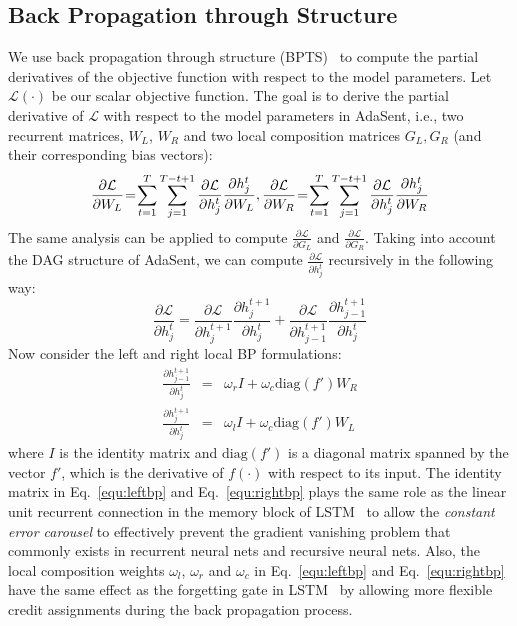 \documentclass{article}
\theoremstyle{definition}
\begin{document}
\subsection{Back Propagation through Structure}
We use back propagation through structure (BPTS)~\cite{goller1996learning} to compute the partial derivatives of the objective function with respect to the model parameters. Let $\mathcal{L}(\cdot)$ be our scalar objective function. The goal is to derive the partial derivative of $\mathcal{L}$ with respect to the model parameters in AdaSent, i.e., two recurrent matrices, $W_L$, $W_R$ and two local composition matrices $G_L, G_R$ (and their corresponding bias vectors):
\begin{equation} 
\frac{\partial \mathcal{L}}{\partial W_L}\hspace{-2pt} =\hspace{-2pt} \sum_{t = 1}^T\sum_{j=1}^{T-t+1}\frac{\partial \mathcal{L}}{\partial h^t_{j}}\frac{\partial h^t_j}{\partial W_L}, \frac{\partial\mathcal{L}}{\partial W_R} \hspace{-2pt} = \hspace{-2pt} \sum_{t = 1}^T\sum_{j=1}^{T-t+1}\frac{\partial \mathcal{L}}{\partial h^t_{j}}\frac{\partial h_j^t}{\partial W_R}
\end{equation}
The same analysis can be applied to compute $\frac{\partial \mathcal{L}}{\partial G_L}$ and $\frac{\partial \mathcal{L}}{\partial G_R}$. Taking into account the DAG structure of AdaSent, we can compute $\frac{\partial \mathcal{L}}{\partial h^t_j}$ recursively in the following way:
\begin{equation}
\frac{\partial \mathcal{L}}{\partial h^t_j} = \frac{\partial \mathcal{L}}{\partial h^{t+1}_j}\frac{\partial h^{t+1}_j}{\partial h^t_j} + \frac{\partial\mathcal{L}}{\partial h^{t+1}_{j-1}}\frac{\partial h^{t+1}_{j-1}}{\partial h^{t}_{j}}
\end{equation}
Now consider the left and right local BP formulations:
\begin{eqnarray}
\label{equ:leftbp}
\frac{\partial h^{t+1}_{j-1}}{\partial h^t_j} &=& \omega_r I + \omega_c\text{diag}(f')W_R\\
\frac{\partial h^{t+1}_j}{\partial h^t_j} &=& \omega_l I + \omega_c\text{diag}(f')W_L
\label{equ:rightbp} 
\end{eqnarray}
where $I$ is the identity matrix and $\text{diag}(f')$ is a diagonal matrix spanned by the vector $f'$, which is the derivative of $f(\cdot)$ with respect to its input. The identity matrix in Eq.~\ref{equ:leftbp} and Eq.~\ref{equ:rightbp} plays the same role as the linear unit recurrent connection in the memory block of LSTM~\cite{hochreiter1997long} to allow the \emph{constant error carousel} to effectively prevent the gradient vanishing problem that commonly exists in recurrent neural nets and recursive neural nets. Also, the local composition weights $\omega_l$, $\omega_r$ and $\omega_c$ in Eq.~\ref{equ:leftbp} and Eq.~\ref{equ:rightbp} have the same effect as the forgetting gate in LSTM~\cite{gers2000learning} by allowing more flexible credit assignments during the back propagation process.
\end{document}

